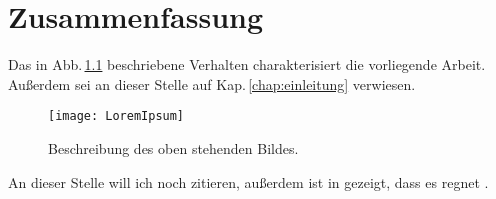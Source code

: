 \graphicspath{{grafiken/zusammenfassung/}}

\chapter{Zusammenfassung}

Das in Abb.\,\ref{fig:LoremIpsum} beschriebene Verhalten charakterisiert die vorliegende Arbeit. Au\ss erdem sei an dieser Stelle auf Kap.\,\ref{chap:einleitung} verwiesen.

\begin{figure}[htbp]
\centering
\texttt{[image: LoremIpsum]}
\caption{Beschreibung des oben stehenden Bildes.}
\label{fig:LoremIpsum}
\end{figure}

An dieser Stelle will ich noch \cite{sahin:penning} zitieren, au\ss erdem ist in \cite{zibell:diplarbeit} gezeigt, dass es regnet \cite{zibell:phd}.